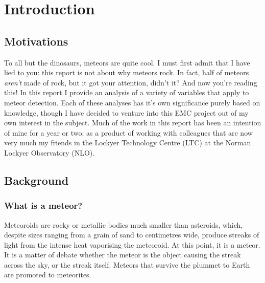 \chapter{Introduction}
\label{chap:intro}
\section{Motivations}
To all but the dinosaurs, meteors are quite cool. I must first admit that I have lied to you: this report is not about why meteors rock. In fact, half of meteors {\it aren't} made of rock, but it got your attention, didn't it? And now you're reading this! In this report I provide an analysis of a variety of variables that apply to meteor detection. Each of these analyses has it's own significance purely based on knowledge, though I have decided to venture into this EMC project out of my own interest in the subject. Much of the work in this report has been an intention of mine for a year or two; as a product of working with colleagues that are now very much my friends in the Lockyer Technology Centre (LTC) at the Norman Lockyer Observatory (NLO).
\section{Background}
\subsection{What is a meteor?}
Meteoroids are rocky or metallic bodies much smaller than asteroids, which, despite sizes ranging from a grain of sand to centimetres wide, produce streaks of light from the intense heat vaporising the meteoroid. At this point, it is a meteor. It is a matter of debate whether the meteor is the object causing the streak across the sky, or the streak itself. Meteors that survive the plummet to Earth are promoted to meteorites. \\
